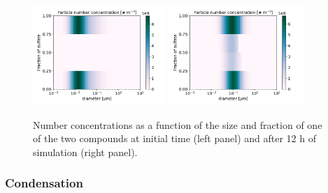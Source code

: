 \documentclass[a4paper,11pt]{article}
\begin{document}
{{\begin{figure}[H]
        \begin{center}
                \includegraphics[angle=0,width=0.45\textwidth]{../graph/figure_ref/coag_ext_init.png}
                \includegraphics[angle=0,width=0.45\textwidth]{../graph/figure_ref/coag_ext_out.png}
        \end{center}
\caption{Number concentrations as a function of the size and fraction of one of the
two compounds at initial time (left panel) and after 12 h of simulation (right panel).}
\label{fig-coag-extb}
\end{figure}
 
\subsubsection{Condensation}

}}
\end{document}

